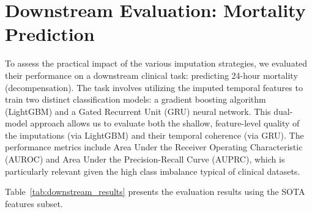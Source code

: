 \section{Downstream Evaluation: Mortality Prediction}
\label{sec:downstream_evaluation}

To assess the practical impact of the various imputation strategies, we evaluated their performance on a downstream clinical task: predicting 24-hour mortality (decompensation). The task involves utilizing the imputed temporal features to train two distinct classification models: a gradient boosting algorithm (LightGBM) and a Gated Recurrent Unit (GRU) neural network. This dual-model approach allows us to evaluate both the shallow, feature-level quality of the imputations (via LightGBM) and their temporal coherence (via GRU). The performance metrics include Area Under the Receiver Operating Characteristic (AUROC) and Area Under the Precision-Recall Curve (AUPRC), which is particularly relevant given the high class imbalance typical of clinical datasets.

Table~\ref{tab:downstream_results} presents the evaluation results using the SOTA features subset.


